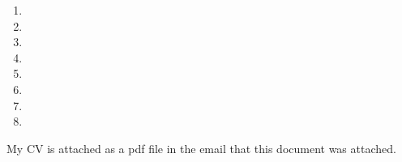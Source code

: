 \documentclass[11pt]{article}
\newcommand{\comments}[1]{}
\begin{document}



\begin{enumerate} 
\item 
\item 
\item 
\item 
\item 
\item 
\item 
\item 
\end{enumerate} 

My CV is attached as a pdf file in the email that this document was
attached.\\

\comments{
My research focus is performance tuning loops performing computational work in
parallel computer programs. This is done through experimentally tuning
different different loop execution strategies and choosing the best
performing configuration for production runs. In the worst case, there
may be P(n,c) different schedules for which the performance is
measured. With loop sizes typically 1000 and number of cores typically
16-64, this entails a large data set to go through. The question is
how do we quickly find the minima? Also, how do we ensure we haven't
missed out on the best configuration? These questions can be answered
by attending the SLS forum focused on machine learning, particularly focus
item 1 listed on the website.
}
\end{document}
